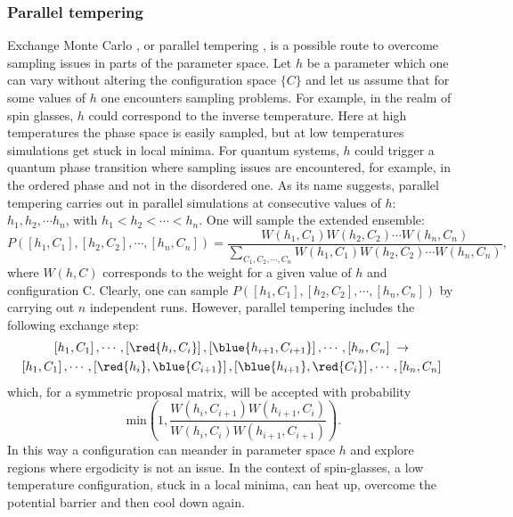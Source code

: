 \subsubsection{Parallel tempering } 
\label{Parallel_tempering.sec}
% 
Exchange Monte Carlo \cite{Hukushima96}, or parallel tempering \cite{Greyer91}, is a possible route to overcome sampling issues in parts of the parameter space.
Let $h$ be a parameter which one can vary without  altering the configuration space $ \{C  \}  $ and let us assume that for some values of $h$ one encounters sampling problems.   For example, in the realm of spin glasses, $h$  could correspond to the  inverse temperature.  Here at high temperatures the phase space is easily sampled, but at low temperatures  simulations get stuck in local minima. For quantum systems, $h$ could   trigger a quantum phase transition where  sampling issues are encountered, for example, in the ordered phase and not in the disordered one.   As its name suggests, parallel tempering  carries out in parallel simulations at consecutive  values of  $h$:  $h_1, h_2,  \cdots h_n$, with  $h_{1} < h_2 < \cdots < h_n$.  One will sample the extended ensemble:
\begin{equation}
	P(\left[h_1,C_1\right], \left[h_2,C_2\right], \cdots, \left[h_n,C_n\right] ) =  \frac{W(h_1,C_1) W(h_2,C_2) \cdots   W(h_n,C_n) } {\sum_{C_1, C_2, \cdots, C_n} W( h_1,C_1) W( h_2,C_2) \cdots   W(h_n,C_n) },
\end{equation}
where $W(h,C)$ corresponds to the weight for a given value of $h$ and configuration C. 
Clearly, one can sample  $P( \left[h_1,C_1\right], \left[h_2,C_2\right], \cdots, \left[h_n,C_n\right])$ by carrying out $n$ independent runs.
However, parallel tempering  includes the following   exchange step:
\begin{multline} \label{eq:exchangestep}
	\left[h_1,C_1\right], \cdots, \left[\red{h_i,C_i}\right],\left[\blue{h_{i+1},C_{i+1}}\right], \cdots, \left[h_n,C_n\right]  \; \rightarrow \\
	\left[h_1,C_1\right], \cdots, \left[\red{h_i},\blue{C_{i+1}}\right],\left[\blue{h_{i+1}},\red{C_{i}}\right], \cdots, \left[h_n,C_n\right]
\end{multline}
which, for a symmetric proposal matrix, will  be accepted with probability
\begin{equation}
	\text{ min} \left( 1,   \frac{ W(h_i,C_{i+1}) W(h_{i+1},C_{i})}{W(h_i,C_{i}) W(h_{i+1},C_{i+1})} \right).
\end{equation}
In this way a configuration can meander in parameter space $h$ and  explore regions where ergodicity is not an issue. In the context of spin-glasses, a low temperature configuration, stuck in a local minima, can heat up, overcome the potential  barrier and then cool down again. 
 
